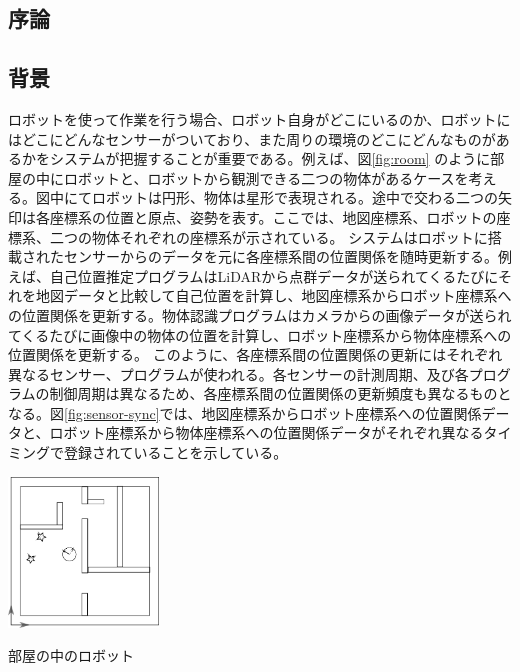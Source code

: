 \documentclass{jarticle}
\begin{document}
\begin{multicols}{2}

\section{序論}
\subsection{背景}
ロボットを使って作業を行う場合、ロボット自身がどこにいるのか、ロボットにはどこにどんなセンサーがついており、また周りの環境のどこにどんなものがあるかをシステムが把握することが重要である。例えば、図\ref{fig:room} のように部屋の中にロボットと、ロボットから観測できる二つの物体があるケースを考える。図中にてロボットは円形、物体は星形で表現される。途中で交わる二つの矢印は各座標系の位置と原点、姿勢を表す。ここでは、地図座標系、ロボットの座標系、二つの物体それぞれの座標系が示されている。
システムはロボットに搭載されたセンサーからのデータを元に各座標系間の位置関係を随時更新する。例えば、自己位置推定プログラムはLiDARから点群データが送られてくるたびにそれを地図データと比較して自己位置を計算し、地図座標系からロボット座標系への位置関係を更新する。物体認識プログラムはカメラからの画像データが送られてくるたびに画像中の物体の位置を計算し、ロボット座標系から物体座標系への位置関係を更新する。
このように、各座標系間の位置関係の更新にはそれぞれ異なるセンサー、プログラムが使われる。各センサーの計測周期、及び各プログラムの制御周期は異なるため、各座標系間の位置関係の更新頻度も異なるものとなる。図\ref{fig:sensor-sync}では、地図座標系からロボット座標系への位置関係データと、ロボット座標系から物体座標系への位置関係データがそれぞれ異なるタイミングで登録されていることを示している。


\begin{figurehere} 
\centering
\includegraphics[width=0.3\textwidth]{room}	
\caption{部屋の中のロボット}
\label{fig:room}
\end{figurehere}



\end{multicols}
\end{document}
